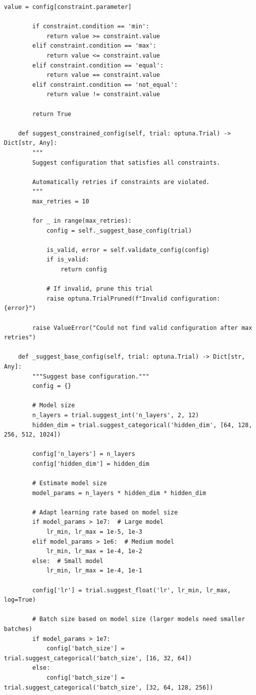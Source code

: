 \begin{lstlisting}[style=python, caption=Intelligent search space pruning]
        value = config[constraint.parameter]

        if constraint.condition == 'min':
            return value >= constraint.value
        elif constraint.condition == 'max':
            return value <= constraint.value
        elif constraint.condition == 'equal':
            return value == constraint.value
        elif constraint.condition == 'not_equal':
            return value != constraint.value

        return True

    def suggest_constrained_config(self, trial: optuna.Trial) -> Dict[str, Any]:
        """
        Suggest configuration that satisfies all constraints.

        Automatically retries if constraints are violated.
        """
        max_retries = 10

        for _ in range(max_retries):
            config = self._suggest_base_config(trial)

            is_valid, error = self.validate_config(config)
            if is_valid:
                return config

            # If invalid, prune this trial
            raise optuna.TrialPruned(f"Invalid configuration: {error}")

        raise ValueError("Could not find valid configuration after max retries")

    def _suggest_base_config(self, trial: optuna.Trial) -> Dict[str, Any]:
        """Suggest base configuration."""
        config = {}

        # Model size
        n_layers = trial.suggest_int('n_layers', 2, 12)
        hidden_dim = trial.suggest_categorical('hidden_dim', [64, 128, 256, 512, 1024])

        config['n_layers'] = n_layers
        config['hidden_dim'] = hidden_dim

        # Estimate model size
        model_params = n_layers * hidden_dim * hidden_dim

        # Adapt learning rate based on model size
        if model_params > 1e7:  # Large model
            lr_min, lr_max = 1e-5, 1e-3
        elif model_params > 1e6:  # Medium model
            lr_min, lr_max = 1e-4, 1e-2
        else:  # Small model
            lr_min, lr_max = 1e-4, 1e-1

        config['lr'] = trial.suggest_float('lr', lr_min, lr_max, log=True)

        # Batch size based on model size (larger models need smaller batches)
        if model_params > 1e7:
            config['batch_size'] = trial.suggest_categorical('batch_size', [16, 32, 64])
        else:
            config['batch_size'] = trial.suggest_categorical('batch_size', [32, 64, 128, 256])


\end{lstlisting}
